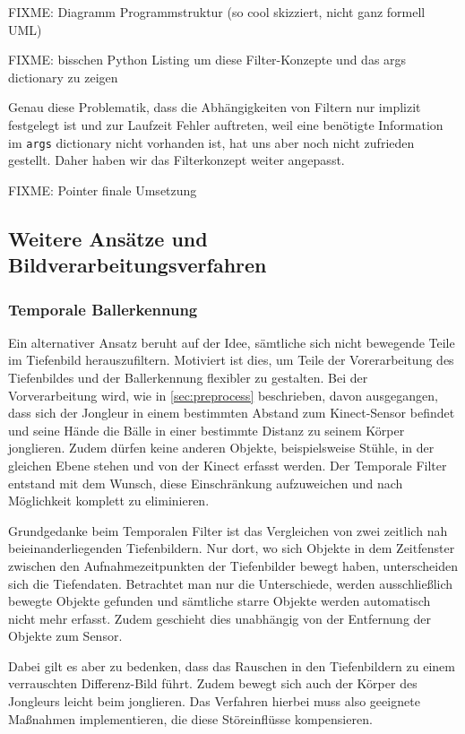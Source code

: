 \documentclass[12pt,a4paper,ngerman]{scrartcl}
\begin{document}
{\color{red} FIXME: Diagramm Programmstruktur (so cool skizziert, nicht ganz formell UML)}

{\color{red} FIXME: bisschen Python Listing um diese Filter-Konzepte und das args dictionary zu zeigen}

Genau diese Problematik, dass die Abhängigkeiten von Filtern nur implizit festgelegt
ist und zur Laufzeit Fehler auftreten, weil eine benötigte Information im
\lstinline{args} dictionary nicht vorhanden ist, hat uns aber noch nicht zufrieden
gestellt. Daher haben wir das Filterkonzept weiter angepasst.

FIXME: Pointer finale Umsetzung

\subsection{Weitere Ansätze und Bildverarbeitungsverfahren}

\subsubsection{Temporale Ballerkennung}
\label{sec:temporal}

Ein alternativer Ansatz beruht auf der Idee, sämtliche sich nicht bewegende Teile im Tiefenbild herauszufiltern. Motiviert ist dies, um Teile der Vorerarbeitung des Tiefenbildes und der Ballerkennung flexibler zu gestalten. Bei der Vorverarbeitung wird, wie in \ref{sec:preprocess} beschrieben, davon ausgegangen, dass sich der Jongleur in einem bestimmten Abstand zum Kinect-Sensor befindet und seine Hände  die Bälle in einer bestimmte Distanz zu seinem Körper jonglieren. Zudem dürfen keine anderen Objekte,
beispielsweise Stühle, in der gleichen Ebene stehen und von der Kinect erfasst werden.
Der Temporale Filter entstand mit dem Wunsch, diese Einschränkung aufzuweichen und nach Möglichkeit komplett zu eliminieren.

Grundgedanke beim Temporalen Filter ist das Vergleichen von zwei zeitlich nah beieinanderliegenden Tiefenbildern.
Nur dort, wo sich Objekte in dem Zeitfenster zwischen den Aufnahmezeitpunkten der Tiefenbilder bewegt haben,
unterscheiden sich die Tiefendaten. Betrachtet man nur die Unterschiede, werden ausschließlich bewegte Objekte gefunden und sämtliche starre Objekte werden automatisch nicht mehr erfasst.
Zudem geschieht dies unabhängig von der Entfernung der Objekte zum Sensor.

Dabei gilt es aber zu bedenken, dass das Rauschen in den Tiefenbildern zu einem verrauschten Differenz-Bild führt. Zudem bewegt sich auch der Körper des Jongleurs leicht beim jonglieren. Das Verfahren hierbei muss also geeignete Maßnahmen implementieren, die diese Störeinflüsse kompensieren.
\end{document}
